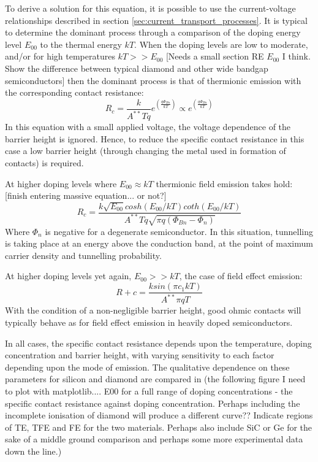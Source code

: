 To derive a solution for this equation, it is possible to use the current-voltage relationships described in section \ref{sec:current_transport_processes}. It is typical to determine the dominant process through a comparison of the doping energy level $E_{00}$ to the thermal energy $kT$. When the doping levels are low to moderate, and/or for high temperatures $kT>>E_{00}$ [Needs a small section RE $E_{00}$ I think. Show the difference between typical diamond and other wide bandgap semiconductors] then the dominant process is that of thermionic emission with the corresponding contact resistance: 
\begin{equation}
	R_{c}=\frac{k}{A^{**}Tq}e^{\left(\frac{q\Phi_{Bn}}{kT}\right)}\propto e^{\left(\frac{q\Phi_{Bn}}{kT}\right)}
	\label{eq:specific_contact_resistance_thermionic}
\end{equation}
In this equation with a small applied voltage, the voltage dependence of the barrier height is ignored. Hence, to reduce the specific contact resistance in this case a low barrier height (through changing the metal used in formation of contacts) is required.

At higher doping levels where $E_{00}\approx kT$ thermionic field emission takes hold: [finish entering massive equation... or not?]
\begin{equation}
	R_{c}=\frac{k\sqrt{E_{00}} cosh\left(E_{00}/kT\right)coth\left(E_{00}/kT\right)}{A^{**}Tq\sqrt{\pi q\left(\Phi_{Bn}-\Phi_{n}\right)}}
\end{equation}
Where $\Phi_{n}$ is negative for a degenerate semiconductor. In this situation, tunnelling is taking place at an energy above the conduction band, at the point of maximum carrier density and tunnelling probability.

At higher doping levels yet again, $E_{00}>>kT$, the case of field effect emission:
\begin{equation}
	R+{c}=\frac{k sin\left(\pi c_{1}kT\right)}{A^{**}\pi qT}
	\label{eq:specific_contact_resistance_field_effect}
\end{equation}
With the condition of a non-negligible barrier height, good ohmic contacts will typically behave as for field effect emission in heavily doped semiconductors.

In all cases, the specific contact resistance depends upon the temperature, doping concentration and barrier height, with varying sensitivity to each factor depending upon the mode of emission. The qualitative dependence on these parameters for silicon and diamond are compared in (the following figure I need to plot with matplotlib.... E00 for a full range of doping concentrations - the specific contact resistance against doping concentration. Perhaps including the incomplete ionisation of diamond will produce a different curve?? Indicate regions of TE, TFE and FE for the two materials. Perhaps also include SiC or Ge for the sake of a middle ground comparison and perhaps some more experimental data down the line.)

